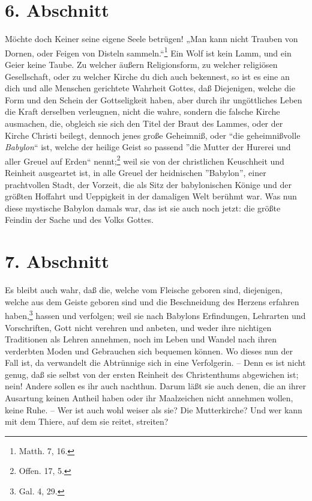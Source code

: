 \section{6. Abschnitt}

Möchte doch Keiner seine eigene Seele betrügen! „Man kann nicht Trauben von Dornen, oder Feigen von Disteln sammeln.“\footnote{Matth. 7, 16.} Ein Wolf ist kein Lamm, und ein Geier keine Taube. Zu welcher äußern Religionsform, zu welcher religiösen Gesellschaft, oder zu welcher Kirche du dich auch bekennest, so ist es eine an dich und alle Menschen gerichtete Wahrheit Gottes, daß Diejenigen, welche die Form und den Schein der Gottseligkeit haben, aber durch ihr ungöttliches Leben die Kraft derselben verleugnen, nicht die wahre, sondern die falsche Kirche ausmachen, die, obgleich sie sich den Titel der Braut des Lammes, oder der Kirche Christi beilegt, dennoch jenes große Geheimniß, oder ``die geheimnißvolle \textit{Babylon}`` ist, welche der heilige Geist so passend ''die Mutter der Hurerei und aller Greuel auf Erden`` nennt;\footnote{Offen. 17, 5.} weil sie von der christlichen Keuschheit und Reinheit ausgeartet ist, in alle Greuel der heidnischen ''Babylon'', einer prachtvollen Stadt, der Vorzeit, die als Sitz der babylonischen Könige und der größten Hoffahrt und Ueppigkeit in der damaligen Welt berühmt war. Was nun diese mystische Babylon damals war, das ist sie auch noch jetzt: die größte Feindin der Sache und des Volks Gottes.

\section{7. Abschnitt}

Es bleibt auch wahr, daß die, welche vom Fleische geboren sind, diejenigen, welche aus dem Geiste geboren sind und die Beschneidung des Herzens erfahren haben,\footnote{Gal. 4, 29.} hassen und verfolgen; weil sie nach Babylons Erfindungen, Lehrarten und Vorschriften, Gott nicht verehren und anbeten, und weder ihre nichtigen Traditionen als Lehren annehmen, noch im Leben und Wandel nach ihren verderbten Moden und Gebrauchen sich bequemen können. Wo dieses nun der Fall ist, da verwandelt die Abtrünnige sich in eine Verfolgerin. – Denn es ist nicht genug, daß sie selbst von der ersten Reinheit des Christenthums abgewichen ist; nein! Andere sollen es ihr auch nachthun. Darum läßt sie auch denen, die an ihrer Ausartung keinen Antheil haben oder ihr Maalzeichen nicht annehmen wollen, keine Ruhe. – Wer ist auch wohl weiser als sie? Die Mutterkirche? Und wer kann mit dem Thiere, auf dem sie reitet, streiten?

